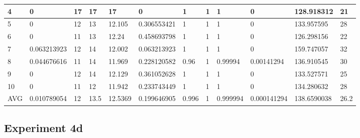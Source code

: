 \begin{table}[H]
\begin{adjustbox}{max width=460pt,keepaspectratio,angle=90}
\begin{tabular}{|l|l|l|l|l|l|l|l|l|l|l|l|}
					4           & 0           & 17         & 17         & 17         & 0           & 1           & 1           & 1           & 0           & 128.918312  & 21                                     \\ \hline
					5           & 0           & 12         & 13         & 12.105     & 0.306553421 & 1           & 1           & 1           & 0           & 133.957595  & 28                                     \\ \hline
					6           & 0           & 11         & 13         & 12.24      & 0.458693798 & 1           & 1           & 1           & 0           & 126.298156  & 22                                     \\ \hline
					7           & 0.063213923 & 12         & 14         & 12.002     & 0.063213923 & 1           & 1           & 1           & 0           & 159.747057  & 32                                     \\ \hline
					8           & 0.044676616 & 11         & 14         & 11.969     & 0.228120582 & 0.96        & 1           & 0.99994     & 0.00141294  & 136.910545  & 30                                     \\ \hline
					9           & 0           & 12         & 14         & 12.129     & 0.361052628 & 1           & 1           & 1           & 0           & 133.527571  & 25                                     \\ \hline
					10          & 0           & 11         & 12         & 11.942     & 0.233743449 & 1           & 1           & 1           & 0           & 134.280632  & 28                                     \\ \hline
					AVG         & 0.010789054 & 12         & 13.5       & 12.5369    & 0.199646905 & 0.996       & 1           & 0.999994    & 0.000141294 & 138.6590038 & 26.2                                   \\ \hline
				\end{tabular}
			\end{adjustbox}	
		\end{table}	
	\subsection{Experiment 4d}
	\label{sec:A_Exp4d}
